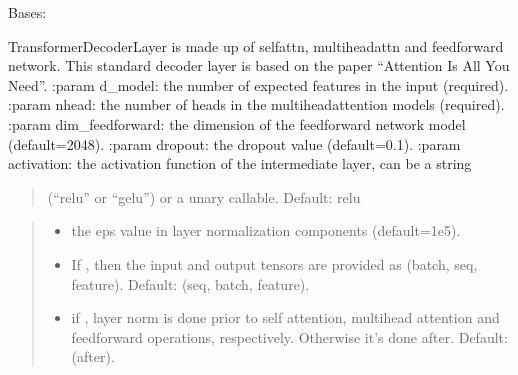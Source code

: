 \documentclass[letterpaper,10pt,english]{sphinxmanual}
\begin{document}
\begin{fulllineitems}
\label{\detokenize{beyondml.pt.layers:beyondml.pt.layers.MaskedTransformerDecoderLayer.MaskedTransformerDecoderLayer}}
\pysigstartsignatures
{}
\pysigstopsignatures
\sphinxAtStartPar
Bases: 

\sphinxAtStartPar
TransformerDecoderLayer is made up of self\sphinxhyphen{}attn, multi\sphinxhyphen{}head\sphinxhyphen{}attn and feedforward network.
This standard decoder layer is based on the paper “Attention Is All You Need”.
:param d\_model: the number of expected features in the input (required).
:param nhead: the number of heads in the multiheadattention models (required).
:param dim\_feedforward: the dimension of the feedforward network model (default=2048).
:param dropout: the dropout value (default=0.1).
:param activation: the activation function of the intermediate layer, can be a string
\begin{quote}

\sphinxAtStartPar
(“relu” or “gelu”) or a unary callable. Default: relu
\end{quote}
\begin{quote}\begin{description}
\begin{itemize}
\item {} 
\sphinxAtStartPar
{} \textendash{} the eps value in layer normalization components (default=1e\sphinxhyphen{}5).

\item {} 
\sphinxAtStartPar
{} \textendash{} If , then the input and output tensors are provided
as (batch, seq, feature). Default:  (seq, batch, feature).

\item {} 
\sphinxAtStartPar
{} \textendash{} if , layer norm is done prior to self attention, multihead
attention and feedforward operations, respectively. Otherwise it’s done after.
Default:  (after).


\end{itemize}
\end{description}
\end{quote}
\end{fulllineitems}
\end{document}
